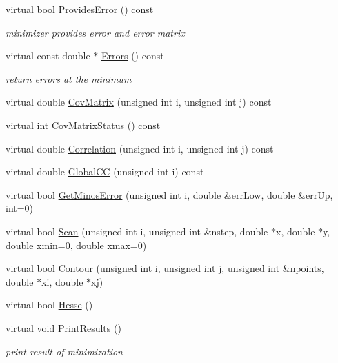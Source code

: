 \begin{DoxyCompactItemize}
\item 
virtual bool \mbox{\hyperlink{classROOT_1_1Minuit2_1_1Minuit2Minimizer_a3a3a8abea38285fe639f2f0ec5505533}{Provides\+Error}} () const
\begin{DoxyCompactList}\small\item\em minimizer provides error and error matrix \end{DoxyCompactList}\item 
virtual const double $\ast$ \mbox{\hyperlink{classROOT_1_1Minuit2_1_1Minuit2Minimizer_a69c6dd9654ce41856814b358570cb9d7}{Errors}} () const
\begin{DoxyCompactList}\small\item\em return errors at the minimum \end{DoxyCompactList}\item 
virtual double \mbox{\hyperlink{classROOT_1_1Minuit2_1_1Minuit2Minimizer_a6ba10de01ab6e7228fa4908894de5619}{Cov\+Matrix}} (unsigned int i, unsigned int j) const
\item 
virtual int \mbox{\hyperlink{classROOT_1_1Minuit2_1_1Minuit2Minimizer_ad9f4873b9651626d2b83cf7eab826b0f}{Cov\+Matrix\+Status}} () const
\item 
virtual double \mbox{\hyperlink{classROOT_1_1Minuit2_1_1Minuit2Minimizer_a229e82025189e72b5a03cb4e3be19f4a}{Correlation}} (unsigned int i, unsigned int j) const
\item 
virtual double \mbox{\hyperlink{classROOT_1_1Minuit2_1_1Minuit2Minimizer_adde21edb0a67e0eef950049528cfb9a7}{Global\+CC}} (unsigned int i) const
\item 
virtual bool \mbox{\hyperlink{classROOT_1_1Minuit2_1_1Minuit2Minimizer_ab6c27c6f165821774dd304561e8956f5}{Get\+Minos\+Error}} (unsigned int i, double \&err\+Low, double \&err\+Up, int=0)
\item 
virtual bool \mbox{\hyperlink{classROOT_1_1Minuit2_1_1Minuit2Minimizer_a3f2f94c743a9b120a71da5ba23bd88cb}{Scan}} (unsigned int i, unsigned int \&nstep, double $\ast$x, double $\ast$y, double xmin=0, double xmax=0)
\item 
virtual bool \mbox{\hyperlink{classROOT_1_1Minuit2_1_1Minuit2Minimizer_a026780c27dd4b179817f826f49e36c8e}{Contour}} (unsigned int i, unsigned int j, unsigned int \&npoints, double $\ast$xi, double $\ast$xj)
\item 
virtual bool \mbox{\hyperlink{classROOT_1_1Minuit2_1_1Minuit2Minimizer_a0cfd04fde73c157de423705625ede51c}{Hesse}} ()
\item 
virtual void \mbox{\hyperlink{classROOT_1_1Minuit2_1_1Minuit2Minimizer_a0caadc2005eac5d87fc7345bd54decf0}{Print\+Results}} ()
\begin{DoxyCompactList}\small\item\em print result of minimization \end{DoxyCompactList}\end{DoxyCompactItemize}
